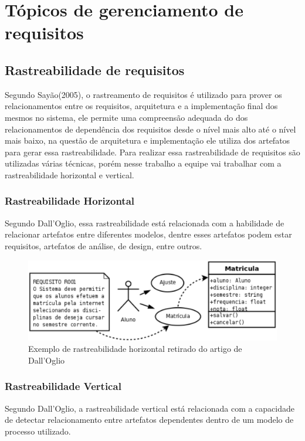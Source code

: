 \chapter{Tópicos de gerenciamento de requisitos}

\section{Rastreabilidade de requisitos}

Segundo Sayão(2005), o rastreamento de requisitos é utilizado para prover os relacionamentos entre os requisitos, arquitetura e a implementação final dos mesmos no sistema, ele permite uma compreensão adequada do dos relacionamentos de dependência dos requisitos desde o nível mais alto até o nível mais baixo, na questão de arquitetura e implementação ele utiliza dos artefatos para gerar essa rastreabilidade.
Para realizar essa rastreabilidade de requisitos são utilizadas várias técnicas, porém nesse trabalho a equipe vai trabalhar com a rastreabilidade horizontal e vertical.

\subsection{Rastreabilidade Horizontal}
Segundo Dall'Oglio, essa rastreabilidade está relacionada com a habilidade de relacionar artefatos entre diferentes modelos, dentre esses artefatos podem estar requisitos, artefatos de análise, de design, entre outros.


\begin{figure}[!htpb]
\centering
\includegraphics[scale=0.4]{figuras/gerenciamento/horizontal}
\caption{Exemplo de rastreabilidade horizontal retirado do artigo de Dall'Oglio}
\end{figure}

\subsection{Rastreabilidade Vertical}
Segundo Dall'Oglio, a rastreabilidade vertical está relacionada com a capacidade de detectar relacionamento entre artefatos dependentes dentro de um modelo de processo utilizado.

